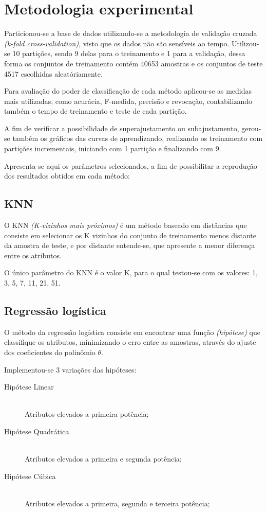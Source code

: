 \section{Metodologia experimental}

Particionou-se a base de dados utilizando-se a metodologia de validação cruzada \emph{(k-fold cross-validation)}, visto que os dados não são sensíveis ao tempo. Utilizou-se 10 partições, sendo 9 delas para o treinamento e 1 para a validação, dessa forma os conjuntos de treinamento contém 40653 amostras e os conjuntos de teste 4517 escolhidas aleatóriamente.

Para avaliação do poder de classificação de cada método aplicou-se as medidas mais utilizadas, como acurácia, F-medida, precisão e revocação, contabilizando também o tempo de treinamento e teste de cada partição.

A fim de verificar a possibilidade de superajustamento ou subajustamento, gerou-se também os gráficos das curvas de aprendizando, realizando os treinamento com partições incrementais, iniciando com 1 partição e finalizando com 9.

Apresenta-se aqui os parâmetros selecionados, a fim de possibilitar a reprodução dos resultados obtidos em cada método:

\subsection{KNN}

O KNN \emph{(K-vizinhos mais próximos)} é um método baseado em distâncias que consiste em selecionar os K vizinhos do conjunto de treinamento menos distante da amostra de teste, e por distante entende-se, que apresente a menor diferença entre os atributos.

O único parâmetro do KNN é o valor K, para o qual testou-se com os valores: 1, 3, 5, 7, 11, 21, 51. 

\subsection{Regressão logística}

O método da regressão logística consiste em encontrar uma função \emph{(hipótese)} que classifique os atributos, minimizando o erro entre as amostras, através do ajuste dos coeficientes do polinômio \(\theta\).

Implementou-se 3 variações das hipóteses:

\begin{description}
\item[Hipótese Linear] \hfill \\ Atributos elevados a primeira potência;
\item[Hipótese Quadrática] \hfill \\ Atributos elevados a primeira e segunda potência;
\item[Hipótese Cúbica] \hfill \\ Atributos elevados a primeira, segunda e terceira potência;
\end{description}


